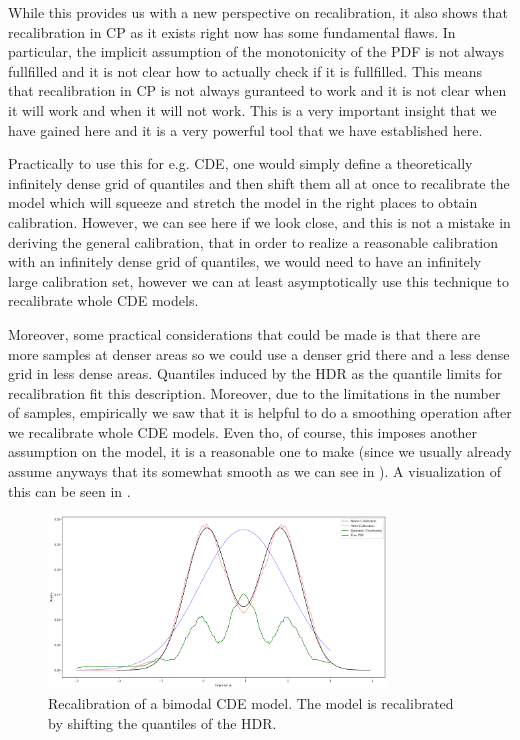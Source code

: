 While this provides us with a new perspective on recalibration, it also shows that recalibration in CP as it exists right now has some fundamental flaws. In particular, the implicit assumption of the monotonicity of the PDF is not always fullfilled and it is not clear how to actually check if it is fullfilled. This means that recalibration in CP is not always guranteed to work and it is not clear when it will work and when it will not work. This is a very important insight that we have gained here and it is a very powerful tool that we have established here.

Practically to use this for e.g. CDE, one would simply define a theoretically infinitely dense grid of quantiles and then shift them all at once to recalibrate the model which will squeeze and stretch the model in the right places to obtain calibration. However, we can see here if we look close, and this is not a mistake in deriving the general calibration, that in order to realize a reasonable calibration with an infinitely dense grid of quantiles, we would need to have an infinitely large calibration set, however we can at least asymptotically use this technique to recalibrate whole CDE models.

Moreover, some practical considerations that could be made is that there are more samples at denser areas so we could use a denser grid there and a less dense grid in less dense areas. Quantiles induced by the HDR as the quantile limits for recalibration fit this description. Moreover, due to the limitations in the number of samples, empirically we saw that it is helpful to do a smoothing operation after we recalibrate whole CDE models. Even tho, of course, this imposes another assumption on the model, it is a reasonable one to make (since we usually already assume anyways that its somewhat smooth as we can see in ). A visualization of this can be seen in .

\begin{figure}
    \centering
    \includegraphics[width=0.8\textwidth]{resources/recalibration_bimodal_cde.png}
    \caption{Recalibration of a bimodal CDE model. The model is recalibrated by shifting the quantiles of the HDR.}
    \label{fig:recalibration}
\end{figure}

